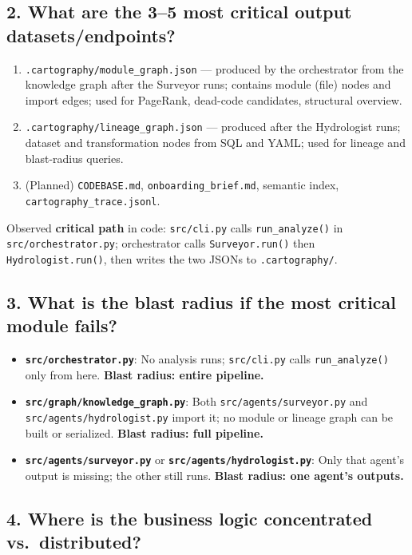 \documentclass[11pt,a4paper]{article}
\begin{document}
\subsection{2. What are the 3--5 most critical output datasets/endpoints?}

\begin{enumerate}[noitemsep]
  \item \texttt{.cartography/module\_graph.json} — produced by the orchestrator from the knowledge graph after the Surveyor runs; contains module (file) nodes and import edges; used for PageRank, dead-code candidates, structural overview.
  \item \texttt{.cartography/lineage\_graph.json} — produced after the Hydrologist runs; dataset and transformation nodes from SQL and YAML; used for lineage and blast-radius queries.
  \item (Planned) \texttt{CODEBASE.md}, \texttt{onboarding\_brief.md}, semantic index, \texttt{cartography\_trace.jsonl}.
\end{enumerate}
Observed \textbf{critical path} in code: \texttt{src/cli.py} calls \texttt{run\_analyze()} in \texttt{src/orchestrator.py}; orchestrator calls \texttt{Surveyor.run()} then \texttt{Hydrologist.run()}, then writes the two JSONs to \texttt{.cartography/}.

\subsection{3. What is the blast radius if the most critical module fails?}

\begin{itemize}[noitemsep]
  \item \textbf{\texttt{src/orchestrator.py}}: No analysis runs; \texttt{src/cli.py} calls \texttt{run\_analyze()} only from here. \textbf{Blast radius: entire pipeline.}
  \item \textbf{\texttt{src/graph/knowledge\_graph.py}}: Both \texttt{src/agents/surveyor.py} and \texttt{src/agents/hydrologist.py} import it; no module or lineage graph can be built or serialized. \textbf{Blast radius: full pipeline.}
  \item \textbf{\texttt{src/agents/surveyor.py}} or \textbf{\texttt{src/agents/hydrologist.py}}: Only that agent's output is missing; the other still runs. \textbf{Blast radius: one agent's outputs.}
\end{itemize}

\subsection{4. Where is the business logic concentrated vs.\ distributed?}
\end{document}

